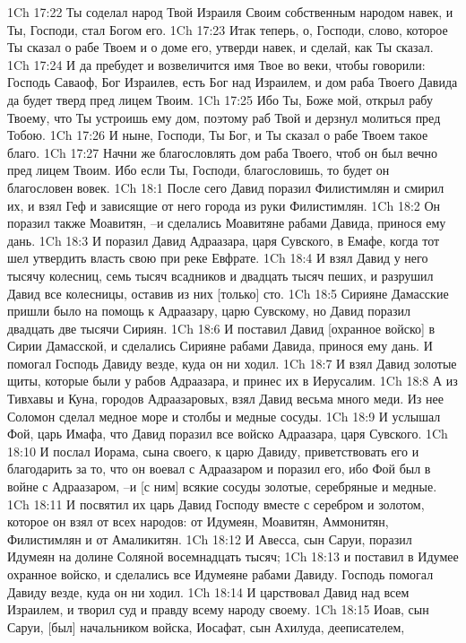 1Ch 17:22  Ты соделал народ Твой Израиля Своим собственным народом навек, и Ты, Господи, стал Богом его.
1Ch 17:23  Итак теперь, о, Господи, слово, которое Ты сказал о рабе Твоем и о доме его, утверди навек, и сделай, как Ты сказал.
1Ch 17:24  И да пребудет и возвеличится имя Твое во веки, чтобы говорили: Господь Саваоф, Бог Израилев, есть Бог над Израилем, и дом раба Твоего Давида да будет тверд пред лицем Твоим.
1Ch 17:25  Ибо Ты, Боже мой, открыл рабу Твоему, что Ты устроишь ему дом, поэтому раб Твой и дерзнул молиться пред Тобою.
1Ch 17:26  И ныне, Господи, Ты Бог, и Ты сказал о рабе Твоем такое благо.
1Ch 17:27  Начни же благословлять дом раба Твоего, чтоб он был вечно пред лицем Твоим. Ибо если Ты, Господи, благословишь, то будет он благословен вовек.
1Ch 18:1  После сего Давид поразил Филистимлян и смирил их, и взял Геф и зависящие от него города из руки Филистимлян.
1Ch 18:2  Он поразил также Моавитян, --и сделались Моавитяне рабами Давида, принося ему дань.
1Ch 18:3  И поразил Давид Адраазара, царя Сувского, в Емафе, когда тот шел утвердить власть свою при реке Евфрате.
1Ch 18:4  И взял Давид у него тысячу колесниц, семь тысяч всадников и двадцать тысяч пеших, и разрушил Давид все колесницы, оставив из них [только] сто.
1Ch 18:5  Сирияне Дамасские пришли было на помощь к Адраазару, царю Сувскому, но Давид поразил двадцать две тысячи Сириян.
1Ch 18:6  И поставил Давид [охранное войско] в Сирии Дамасской, и сделались Сирияне рабами Давида, принося ему дань. И помогал Господь Давиду везде, куда он ни ходил.
1Ch 18:7  И взял Давид золотые щиты, которые были у рабов Адраазара, и принес их в Иерусалим.
1Ch 18:8  А из Тивхавы и Куна, городов Адраазаровых, взял Давид весьма много меди. Из нее Соломон сделал медное море и столбы и медные сосуды.
1Ch 18:9  И услышал Фой, царь Имафа, что Давид поразил все войско Адраазара, царя Сувского.
1Ch 18:10  И послал Иорама, сына своего, к царю Давиду, приветствовать его и благодарить за то, что он воевал с Адраазаром и поразил его, ибо Фой был в войне с Адраазаром, --и [с ним] всякие сосуды золотые, серебряные и медные.
1Ch 18:11  И посвятил их царь Давид Господу вместе с серебром и золотом, которое он взял от всех народов: от Идумеян, Моавитян, Аммонитян, Филистимлян и от Амаликитян.
1Ch 18:12  И Авесса, сын Саруи, поразил Идумеян на долине Соляной восемнадцать тысяч;
1Ch 18:13  и поставил в Идумее охранное войско, и сделались все Идумеяне рабами Давиду. Господь помогал Давиду везде, куда он ни ходил.
1Ch 18:14  И царствовал Давид над всем Израилем, и творил суд и правду всему народу своему.
1Ch 18:15  Иоав, сын Саруи, [был] начальником войска, Иосафат, сын Ахилуда, дееписателем,
